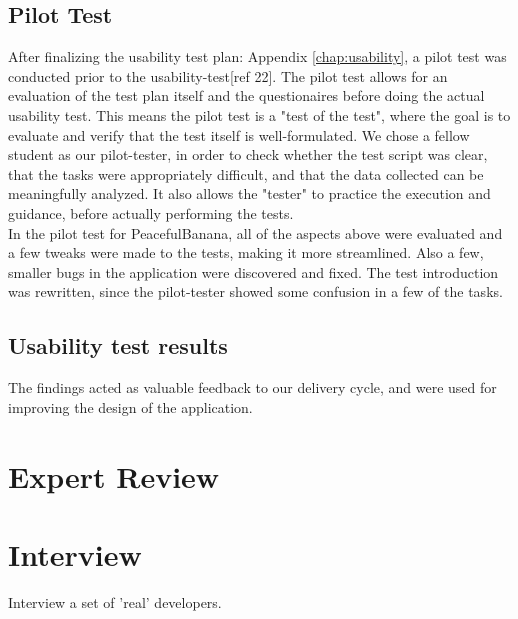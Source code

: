 \subsection{Pilot Test}
After finalizing the usability test plan: Appendix \ref{chap:usability}, a pilot test was conducted prior to the usability-test[ref 22]. The pilot test allows for an evaluation of the test plan itself and the questionaires before doing the actual usability test. This means the pilot test is a "test of the test", where the goal is to evaluate and verify that the test itself is well-formulated. We chose a fellow student as our pilot-tester, in order to check whether the test script was clear, that the tasks were appropriately difficult, and that the data collected can be meaningfully analyzed.
It also allows the "tester" to practice the execution and guidance, before actually performing the tests. \\
In the pilot test for PeacefulBanana, all of the aspects above were evaluated and a few tweaks were made to the tests, making it more streamlined. Also a few, smaller bugs in the application were discovered and fixed. The test introduction was rewritten, since the pilot-tester showed some confusion in a few of the tasks. 

\subsection{Usability test results}
The findings acted as valuable feedback to our delivery cycle, and were used for improving the design of the application. 



\section{Expert Review}

\section{Interview}
Interview a set of 'real' developers.

